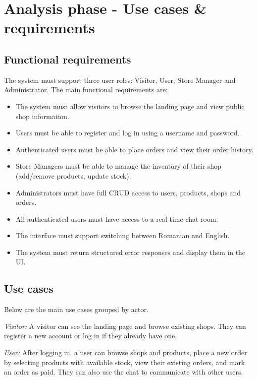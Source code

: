 \documentclass[12pt, a4paper]{article}
\begin{document}
\section{Analysis phase - Use cases \& requirements}

\subsection{Functional requirements}

The system must support three user roles: Visitor, User, Store Manager and Administrator.
The main functional requirements are:

\begin{itemize}
    \item The system must allow visitors to browse the landing page and view public shop information.
    \item Users must be able to register and log in using a username and password.
    \item Authenticated users must be able to place orders and view their order history.
    \item Store Managers must be able to manage the inventory of their shop (add/remove products, update stock).
    \item Administrators must have full CRUD access to users, products, shops and orders.
    \item All authenticated users must have access to a real-time chat room.
    \item The interface must support switching between Romanian and English.
    \item The system must return structured error responses and display them in the UI.
\end{itemize}

\subsection{Use cases}

Below are the main use cases grouped by actor.

\textit{Visitor:} A visitor can see the landing page and browse existing shops. They can register
a new account or log in if they already have one.

\textit{User:} After logging in, a user can browse shops and products, place a new order by
selecting products with available stock, view their existing orders, and mark an order as paid.
They can also use the chat to communicate with other users.
\end{document}
